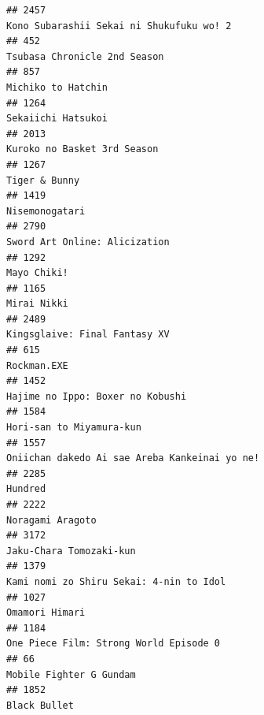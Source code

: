 \documentclass[
]{article}
\begin{document}
\begin{verbatim}
## 2457                                                                  Kono Subarashii Sekai ni Shukufuku wo! 2
## 452                                                                               Tsubasa Chronicle 2nd Season
## 857                                                                                         Michiko to Hatchin
## 1264                                                                                        Sekaiichi Hatsukoi
## 2013                                                                               Kuroko no Basket 3rd Season
## 1267                                                                                             Tiger & Bunny
## 1419                                                                                            Nisemonogatari
## 2790                                                                             Sword Art Online: Alicization
## 1292                                                                                               Mayo Chiki!
## 1165                                                                                               Mirai Nikki
## 2489                                                                             Kingsglaive: Final Fantasy XV
## 615                                                                                                Rockman.EXE
## 1452                                                                          Hajime no Ippo: Boxer no Kobushi
## 1584                                                                                  Hori-san to Miyamura-kun
## 1557                                                             Oniichan dakedo Ai sae Areba Kankeinai yo ne!
## 2285                                                                                                   Hundred
## 2222                                                                                          Noragami Aragoto
## 3172                                                                                   Jaku-Chara Tomozaki-kun
## 1379                                                                   Kami nomi zo Shiru Sekai: 4-nin to Idol
## 1027                                                                                            Omamori Himari
## 1184                                                                    One Piece Film: Strong World Episode 0
## 66                                                                                     Mobile Fighter G Gundam
## 1852                                                                                              Black Bullet

\end{verbatim}
\end{document}
